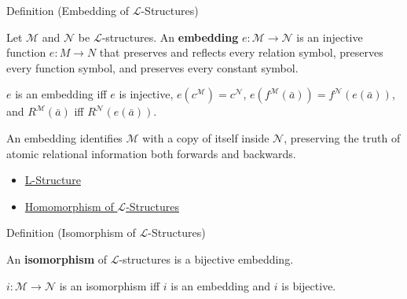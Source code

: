 \begin{definitionbox}{Definition (Embedding of $\mathcal{L}$-Structures)}
\begin{definition}\label{def:l-structure-embedding}
Let $\mathcal{M}$ and $\mathcal{N}$ be $\mathcal{L}$-structures. An
\textbf{embedding} $e\colon\mathcal{M}\to\mathcal{N}$ is an injective function
$e\colon M\to N$ that preserves and reflects every relation symbol, preserves
every function symbol, and preserves every constant symbol.
\end{definition}
\end{definitionbox}

\begin{remark*}
$e$ is an embedding iff $e$ is injective,
$e(c^{\mathcal{M}})=c^{\mathcal{N}}$,
$e(f^{\mathcal{M}}(\bar a))=f^{\mathcal{N}}(e(\bar a))$, and
$R^{\mathcal{M}}(\bar a)$ iff $R^{\mathcal{N}}(e(\bar a))$.
\end{remark*}

\begin{remark*}[Interpretation]
An embedding identifies $\mathcal{M}$ with a copy of itself inside
$\mathcal{N}$, preserving the truth of atomic relational information both
forwards and backwards.
\end{remark*}

\begin{dependencies}
\begin{itemize}
  \item \hyperref[def:l-structure]{L-Structure}
  \item \hyperref[def:l-structure-homomorphism]{Homomorphism of $\mathcal{L}$-Structures}
\end{itemize}
\end{dependencies}

\begin{definitionbox}{Definition (Isomorphism of $\mathcal{L}$-Structures)}
\begin{definition}\label{def:l-structure-isomorphism}
An \textbf{isomorphism} of $\mathcal{L}$-structures is a bijective embedding.
\end{definition}
\end{definitionbox}

\begin{remark*}
$i\colon\mathcal{M}\to\mathcal{N}$ is an isomorphism iff $i$ is an embedding
and $i$ is bijective.
\end{remark*}

